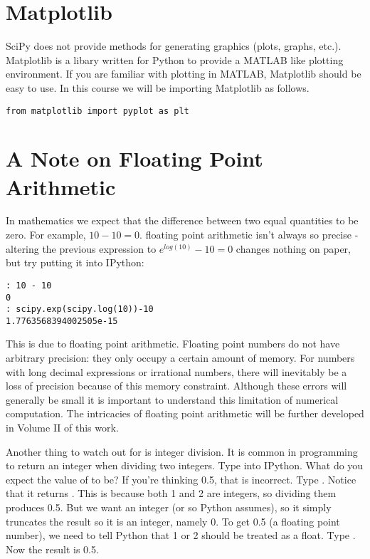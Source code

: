 \section*{Matplotlib}
SciPy does not provide methods for generating graphics (plots, graphs, etc.).  Matplotlib is a libary written for Python to provide a MATLAB like plotting environment.  If you are familiar with plotting in MATLAB, Matplotlib should be easy to use.  In this course we will be importing Matplotlib as follows.
\begin{lstlisting}
from matplotlib import pyplot as plt
\end{lstlisting}

\section*{A Note on Floating Point Arithmetic}

In mathematics we expect that the difference between two equal quantities to be zero.  For example, $10 - 10 = 0$.  floating point arithmetic isn't always so precise - altering the previous expression to $e^{log(10)} - 10 = 0$ changes nothing on paper, but try putting it into IPython:

\begin{lstlisting}
: 10 - 10
0
: scipy.exp(scipy.log(10))-10
1.7763568394002505e-15
\end{lstlisting}

This is due to floating point arithmetic. Floating point numbers do not have arbitrary precision: they only occupy a certain amount of memory.  For numbers with long decimal expressions or irrational numbers, there will inevitably be a loss of precision because of this memory constraint.  Although these errors will generally be small it is important to understand this limitation of numerical computation. The intricacies of floating point arithmetic will be further developed in Volume II of this work.

Another thing to watch out for is integer division.  It is common in programming to return an integer when dividing two integers.  Type  into IPython.  What do you expect the value of  to be?  If you're thinking 0.5, that is incorrect.  Type .  Notice that it returns .  This is because both 1 and 2 are integers, so dividing them produces 0.5.  But we want an integer (or so Python assumes), so it simply truncates the result so it is an integer, namely 0.  To get 0.5 (a floating point number), we need to tell Python that 1 or 2 should be treated as a float.  Type .  Now the result is 0.5.

